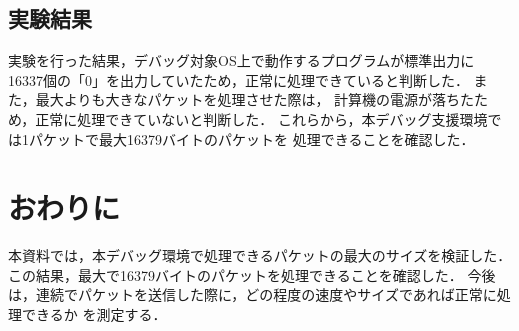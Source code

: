 \documentclass[12pt]{jsarticle}
\begin{document}

\subsection{実験結果}
実験を行った結果，デバッグ対象OS上で動作するプログラムが標準出力に
16337個の「0」を出力していたため，正常に処理できていると判断した．
また，最大よりも大きなパケットを処理させた際は，
計算機の電源が落ちたため，正常に処理できていないと判断した．
これらから，本デバッグ支援環境では1パケットで最大16379バイトのパケットを
処理できることを確認した．

\section{おわりに}
本資料では，本デバッグ環境で処理できるパケットの最大のサイズを検証した．
この結果，最大で16379バイトのパケットを処理できることを確認した．
今後は，連続でパケットを送信した際に，どの程度の速度やサイズであれば正常に処理できるか
を測定する．
\end{document}
